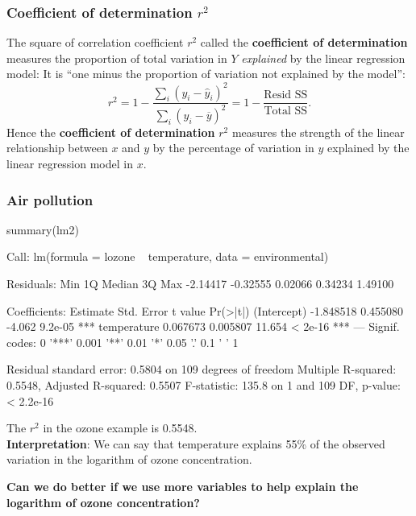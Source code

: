 \documentclass[a4paper]{article}\usepackage[]{graphicx}\usepackage[]{xcolor}
\begin{document}
\subsubsection{Coefficient of determination \( r^2 \)}
The square of correlation coefficient \( r^2 \) called the \textbf{coefficient of determination} measures the proportion of total variation in \( Y \) \textit{explained} by the linear regression model:
It is ``one minus the proportion of variation not explained by the model'':
\[
	r^2 = 1 - \frac{\sum_i (y_i -\hat y_i)^2}{\sum_i (y_i-\overline{y})^2} = 1 - \frac{\text{Resid SS}}{\text{Total SS}}.
\]
Hence the \textbf{coefficient of determination} \( r^2 \) measures the strength of the linear relationship between \( x \) and \( y \) by the percentage of variation in \( y \) explained by the linear regression model in \( x \).
\subsubsection{Air pollution}
\begin{Schunk}
\begin{Sinput}
summary(lm2)
\end{Sinput}
\begin{Soutput}

Call:
lm(formula = lozone ~ temperature, data = environmental)

Residuals:
     Min       1Q   Median       3Q      Max 
-2.14417 -0.32555  0.02066  0.34234  1.49100 

Coefficients:
             Estimate Std. Error t value Pr(>|t|)    
(Intercept) -1.848518   0.455080  -4.062  9.2e-05 ***
temperature  0.067673   0.005807  11.654  < 2e-16 ***
---
Signif. codes:  0 '***' 0.001 '**' 0.01 '*' 0.05 '.' 0.1 ' ' 1

Residual standard error: 0.5804 on 109 degrees of freedom
Multiple R-squared:  0.5548,	Adjusted R-squared:  0.5507 
F-statistic: 135.8 on 1 and 109 DF,  p-value: < 2.2e-16
\end{Soutput}
\end{Schunk}
The \( r^2 \) in the ozone example is 0.5548.\\
\textbf{Interpretation}: We can say that temperature explains 55\% of the observed variation in the logarithm of ozone concentration.
\begin{greenbox}
	\textbf{Can we do better if we use more variables to help explain the logarithm of ozone concentration?}
\end{greenbox}
\end{document}
